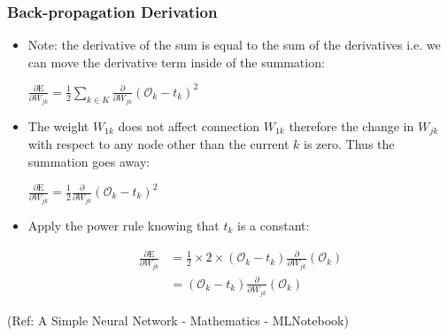 \begin{frame}[fragile] \frametitle{Back-propagation Derivation}

\begin{itemize}
\item Note:  the derivative of the sum is equal to the sum of the derivatives i.e. we can move the derivative term inside of the summation:

$\frac{\partial{\text{E}}}{\partial{W_{jk}}} =  \frac{1}{2} \sum_{k \in K} \frac{\partial{}}{\partial{W_{jk}}} \left( \mathcal{O}_{k} - t_{k} \right)^{2}$

\item The weight $W_{1k}$ does not affect connection $W_{1k}$ therefore the change in $W_{jk}$ with respect to any node other than the current $k$ is zero. Thus the summation goes away:

$\frac{\partial{\text{E}}}{\partial{W_{jk}}} =  \frac{1}{2} \frac{\partial{}}{\partial{W_{jk}}}  \left( \mathcal{O}_{k} - t_{k} \right)^{2}$

\item Apply the power rule knowing that $t_k$ is a constant:

\begin{align}
\frac{\partial{\text{E}}}{\partial{W_{jk}}} &=  \frac{1}{2} \times 2 \times \left( \mathcal{O}_{k} - t_{k} \right) \frac{\partial{}}{\partial{W_{jk}}}  \left( \mathcal{O}_{k}\right) \\
 &=  \left( \mathcal{O}_{k} - t_{k} \right) \frac{\partial{}}{\partial{W_{jk}}}  \left( \mathcal{O}_{k}\right)
\end{align}

\end{itemize}

\tiny{(Ref: A Simple Neural Network - Mathematics - MLNotebook)}
\end{frame}


